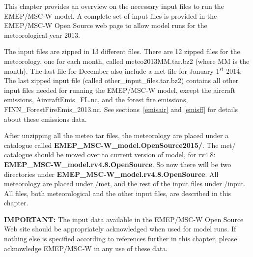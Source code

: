 \documentclass[a4paper,12pt]{report}
\begin{document}
This chapter provides an overview on the necessary input files to run the 
EMEP/MSC-W model. A complete set of input files is provided in the EMEP/MSC-W 
Open Source web page to allow model runs for the meteorological year 2013. 

The input files are zipped in 13 different files. There are 12 zipped files 
for the meteorology, one for each month, called meteo2013MM.tar.bz2 (where MM 
is the month). 
The last file for December also include a met file for January 1$^{st}$ 2014. 
The last zipped input file (called other\_input\_files.tar.bz2) contains all 
other input files needed for running the EMEP/MSC-W model, except the aircraft emissions,
AircraftEmis\_FL.nc, and the forest fire emissions, FINN\_ForestFireEmis\_2013.nc. See sections~\ref{emisair} and \ref{emisff} for details about these emissions data.

After unzipping all the meteo tar files, the meteorology are placed under a
catalogue called {\bf EMEP\-\_MSC-W\_model.OpenSource2015/}. The met/
catalogue should be moved over to current version of model, for rv4.8:
{\bf EMEP\_MSC-W\_model.rv4.8.OpenSource}. 
So now there will be two directories under 
{\bf EMEP\_MSC-W\_model.rv4.8.OpenSource}. 
All meteorology are placed under /met, and the rest of the input files under 
/input. 
All files, both meteorological and the other input files, are described in 
this chapter.

{\bf IMPORTANT:} The input data available in the EMEP/MSC-W Open Source Web
site should be appropriately acknowledged when used for model runs.
If nothing else is specified according to references further in this
chapter, please acknowledge EMEP/MSC-W in any use of these data.
\end{document}
